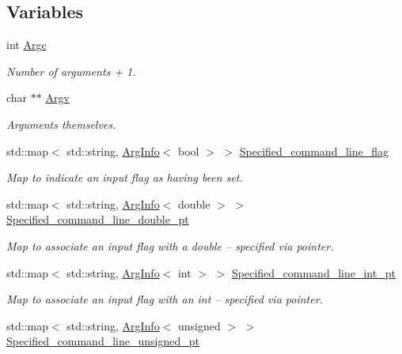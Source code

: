 \subsection*{Variables}
\begin{DoxyCompactItemize}
\item 
int \hyperlink{namespaceoomph_1_1CommandLineArgs_ab0f9a1024bd371139a86ee7db3ddfe83}{Argc}
\begin{DoxyCompactList}\small\item\em Number of arguments + 1. \end{DoxyCompactList}\item 
char $\ast$$\ast$ \hyperlink{namespaceoomph_1_1CommandLineArgs_a3b51290f4dc7018bba2e46bfc6f8bedc}{Argv}
\begin{DoxyCompactList}\small\item\em Arguments themselves. \end{DoxyCompactList}\item 
std\+::map$<$ std\+::string, \hyperlink{structoomph_1_1CommandLineArgs_1_1ArgInfo}{Arg\+Info}$<$ bool $>$ $>$ \hyperlink{namespaceoomph_1_1CommandLineArgs_a26248b14a69e0839c647c5c9540a09b3}{Specified\+\_\+command\+\_\+line\+\_\+flag}
\begin{DoxyCompactList}\small\item\em Map to indicate an input flag as having been set. \end{DoxyCompactList}\item 
std\+::map$<$ std\+::string, \hyperlink{structoomph_1_1CommandLineArgs_1_1ArgInfo}{Arg\+Info}$<$ double $>$ $>$ \hyperlink{namespaceoomph_1_1CommandLineArgs_aa4decec3dde9efd1b7e2e447fe656f41}{Specified\+\_\+command\+\_\+line\+\_\+double\+\_\+pt}
\begin{DoxyCompactList}\small\item\em Map to associate an input flag with a double -- specified via pointer. \end{DoxyCompactList}\item 
std\+::map$<$ std\+::string, \hyperlink{structoomph_1_1CommandLineArgs_1_1ArgInfo}{Arg\+Info}$<$ int $>$ $>$ \hyperlink{namespaceoomph_1_1CommandLineArgs_a872a9f3ad510078d12dc24f19dd54f88}{Specified\+\_\+command\+\_\+line\+\_\+int\+\_\+pt}
\begin{DoxyCompactList}\small\item\em Map to associate an input flag with an int -- specified via pointer. \end{DoxyCompactList}\item 
std\+::map$<$ std\+::string, \hyperlink{structoomph_1_1CommandLineArgs_1_1ArgInfo}{Arg\+Info}$<$ unsigned $>$ $>$ \hyperlink{namespaceoomph_1_1CommandLineArgs_ae489c2891e5e891242ed788b2a64d477}{Specified\+\_\+command\+\_\+line\+\_\+unsigned\+\_\+pt}
$$
\end{DoxyCompactItemize}
